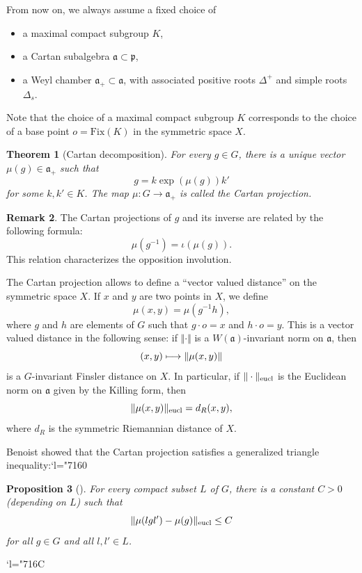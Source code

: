 \documentclass[JEP,XML,SOM,Unicode,NoEqCountersInSection,NoFloatCountersInSection,published]{cedram}
\newcommand\mto{\mathchoice{\longmapsto}{\mapsto}{\mapsto}{\mapsto}}
\newcommand{\Changel}{\mathcode`l="7160}
\newcommand{\Changelback}{\mathcode`l="716C}
\newtheorem{theo}{Theorem}[section]
\newtheorem{prop}[theo]{Proposition}
\theoremstyle{definition}
\newtheorem{rmk}[theo]{Remark}
\newcommand{\fa}{\mathfrak{a}}
\newcommand{\fp}{\mathfrak{p}}
\newcommand{\norm}[1]{\Vert #1 \Vert}
\let\op\iota
\begin{document}
From now on, we always assume a fixed choice of
\begin{itemize}
\item a maximal compact subgroup $K$,
\item a Cartan subalgebra $\fa \subset \fp$,
\item a Weyl chamber $\fa_+ \subset \fa$, with associated positive roots $\Delta^+$ and simple roots $\Delta_s$.
\end{itemize}
Note that the choice of a maximal compact subgroup $K$ corresponds to the choice of a base point $o = \mathrm{Fix}(K)$ in the symmetric space $X$.

\begin{theo}[Cartan decomposition]
For every $g\in G$, there is a unique vector $\mu(g) \in \fa_+$ such that
\[g = k \exp(\mu(g)) k'\]
for some $k,k'\in K$. The map $\mu: G \to \fa_+$ is called the \emph{Cartan projection}.
\end{theo}

\begin{rmk}
The Cartan projections of $g$ and its inverse are related by the following formula:
\[\mu(g^{-1}) = \op(\mu(g)).\]
This relation characterizes the opposition involution.
\end{rmk}

The Cartan projection allows to define a ``vector valued distance'' on the symmetric space $X$. If $x$ and $y$ are two points in $X$, we define
\[\mu(x,y) = \mu(g^{-1}h),\]
where $g$ and $h$ are elements of $G$ such that $g\cdot o = x$ and $h\cdot o = y$. This is a vector valued distance in the following sense: if $\norm{\cdot}$ is a $W(\fa)$-invariant norm on $\fa$, then
\[(x,y) \mto \norm{\mu(x,y)}\]
is a $G$-invariant Finsler distance on $X$. In particular, if $\norm{\cdot}_{\textup{eucl}}$ is the Euclidean norm on $\fa$ given by the Killing form, then
\[\norm{\mu(x,y)}_{\textup{eucl}} = d_R(x,y),\]
where $d_R$ is the symmetric Riemannian distance of $X$.

Benoist showed that the Cartan projection satisfies a generalized triangle inequality:\Changel

\begin{prop}[\cite{benoist1997proprietes}]\label{prop - Benoist cartan projection continuous}
For every compact subset $L$ of $G$, there is a constant $C>0$ (depending on $L$) such that
\[\norm{\mu(lgl') - \mu(g)}_{\textup{eucl}} \leq C\]
for all $g\in G$ and all $l,l'\in L$.
\end{prop}

\Changelback
\end{document}
